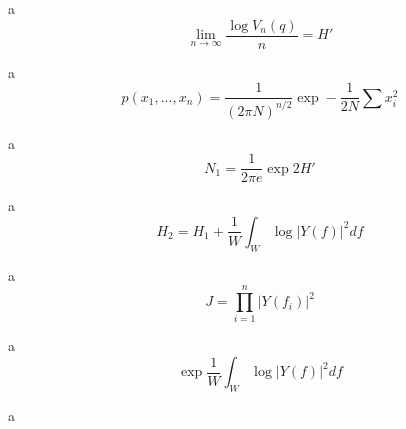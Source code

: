a\\

\begin{equation}
\lim_{n\rightarrow \infty }\frac{\log V_{n}\left ( q \right )}{n}={H}'
\end{equation}

a\\

\begin{equation}
p\left ( x_{1},...,x_{n}\right )=\frac{1}{\left ( 2\pi N \right )^{n/2}}\exp -\frac{1}{2N}\sum x_{i}^{2}
\end{equation}

a\\

\begin{equation}
N_{1}=\frac{1}{2\pi e}\exp 2{H}'
\end{equation}

a\\

\begin{equation}
H_{2}=H_{1}+\frac{1}{W}\int_{W}^{\:}\log \left | Y\left ( f \right ) \right |^{2}df
\end{equation}

a\\

\begin{equation}
J=\prod_{i=1}^{n}\left | Y\left ( f_{i} \right )  \right |^{2}
\end{equation}

a\\

\begin{equation}
\exp \frac{1}{W}\int_{W}^{\:}\log \left | Y\left ( f \right ) \right |^{2}df
\end{equation}

a\\




